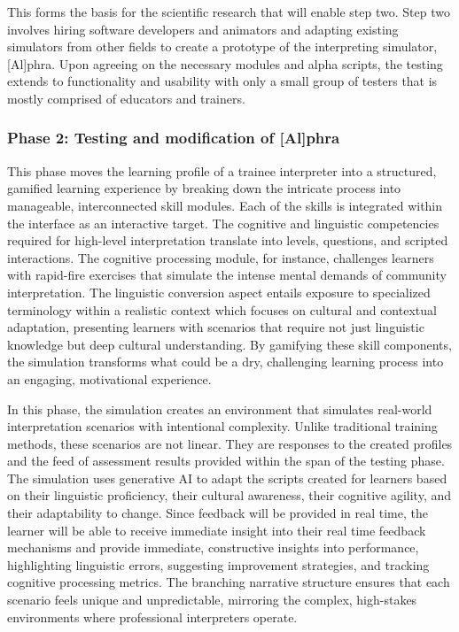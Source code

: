\documentclass[output=paper]{langscibook}
\begin{document}
This forms the basis for the scientific research that will enable step two. Step two involves hiring software developers and animators and adapting existing simulators from other fields to create a prototype of the interpreting simulator, [Al]phra. Upon agreeing on the necessary modules and alpha scripts, the testing extends to functionality and usability with only a small group of testers that is mostly comprised of educators and trainers.

\subsubsection{Phase 2: Testing and modification of [Al]phra}

This phase moves the learning profile of a trainee interpreter into a structured, gamified learning experience by breaking down the intricate process into manageable, interconnected skill modules. Each of the skills is integrated within the interface as an interactive target.  The cognitive and linguistic competencies required for high-level interpretation translate into levels, questions, and scripted interactions. The cognitive processing module, for instance, challenges learners with rapid-fire exercises that simulate the intense mental demands of community interpretation. The linguistic conversion aspect entails exposure to specialized terminology within a realistic context which focuses on cultural and contextual adaptation, presenting learners with scenarios that require not just linguistic knowledge but deep cultural understanding. By gamifying these skill components, the simulation transforms what could be a dry, challenging learning process into an engaging, motivational experience.

In this phase, the simulation creates an environment that simulates real-world interpretation scenarios with intentional complexity. Unlike traditional training methods, these scenarios are not linear. They are responses to the created profiles and the feed of assessment results provided within the span of the testing phase. The simulation uses generative AI to adapt the scripts created for learners based on their linguistic proficiency, their cultural awareness, their cognitive agility, and their adaptability to change. Since feedback will be provided in real time, the learner will be able to receive immediate insight into their real time feedback mechanisms and provide immediate, constructive insights into performance, highlighting linguistic errors, suggesting improvement strategies, and tracking cognitive processing metrics. The branching narrative structure ensures that each scenario feels unique and unpredictable, mirroring the complex, high-stakes environments where professional interpreters operate.
\end{document}

